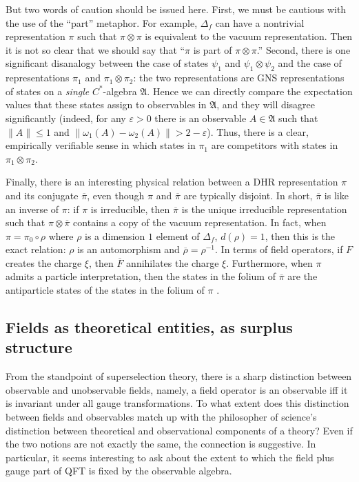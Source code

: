 \documentclass[11pt]{article}
\newcommand{\norm}[1]{\| #1\|}
\theoremstyle{definition}
\theoremstyle{definition}
\theoremstyle{remark}
\def\ol#1{{\overline #1}}
\def\al#1{{\mathfrak #1}}
\def\e{\varepsilon} \def\f{\varphi} \def\k{\kappa} \def\l{\lambda}
\def\om{\omega} \def\Om{\Omega} \def\dd{\partial} \def\D{\Delta}
\begin{document}
But two words of caution should be issued here.  First,
we must be cautious with the use of the ``part''
metaphor.  For example, $\D _f$ can have a nontrivial
representation $\pi$ such that $\pi \otimes \pi$ is
equivalent to the vacuum representation.  Then it is
not so clear that we should say that ``$\pi$ is part of
$\pi \otimes \pi$.''  Second, there is one significant
disanalogy between the case of states $\psi _1$ and
$\psi _1\otimes \psi _2$ and the case of
representations $\pi _1$ and $\pi _1\otimes \pi _2$:
the two representations are GNS representations of
states on a \emph{single} $C^*$-algebra $\al A$.  Hence
we can directly compare the expectation values that
these states assign to observables in $\al A$, and they
will disagree significantly (indeed, for any $\e >0$
there is an observable $A\in \al A$ such that
$\norm{A}\leq 1$ and $\norm{\om _1(A)-\om
  _2(A)}>2-\e$).  Thus, there is a clear, empirically
verifiable sense in which states in $\pi _1$ are
competitors with states in $\pi _1\otimes \pi _2$.

Finally, there is an interesting physical relation between a DHR
representation $\pi$ and its conjugate $\ol \pi$, even though $\pi$
and $\ol \pi$ are typically disjoint.  In short, $\ol \pi$ is like an
inverse of $\pi$: if $\pi$ is irreducible, then $\ol\pi$ is the unique
irreducible representation such that $\pi \otimes \ol\pi$ contains a
copy of the vacuum representation.  In fact, when $\pi =\pi _0\circ
\rho$ where $\rho$ is a dimension $1$ element of $\D _f$, $d(\rho
)=1$, then this is the exact relation: $\rho$ is an automorphism and
$\ol \rho =\rho ^{-1}$.  In terms of field operators, if $F$ creates
the charge $\xi$, then $\ol F$ annihilates the charge $\xi$.
Furthermore, when $\pi$ admits a particle interpretation, then the
states in the folium of $\ol \pi$ are the antiparticle states of the
states in the folium of $\pi$ \cite{dhr2}.

\subsection{Fields as theoretical entities, as surplus structure}

From the standpoint of superselection theory, there is a sharp
distinction between observable and unobservable fields, namely, a
field operator is an observable iff it is invariant under all gauge
transformations.  To what extent does this distinction between fields
and observables match up with the philosopher of science's distinction
between theoretical and observational components of a theory?  Even if
the two notions are not exactly the same, the connection is
suggestive.  In particular, it seems interesting to ask about the
extent to which the field plus gauge part of QFT is fixed by the
observable algebra.
\end{document}
